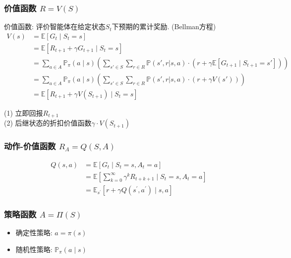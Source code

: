 \documentclass{article}
\begin{document}
        \subsubsection{价值函数 $R = V(S)$}
            价值函数: 评价智能体在给定状态$S_t$下预期的累计奖励. (Bellman方程)
            \begin{align*}
                V(s) 
                &= \mathbb{E} \left[G_t \mid S_t=s\right] \tag{定义}\\
                &= \mathbb{E} \left[R_{t+1} + \gamma G_{t+1} \mid S_t=s\right] \tag{代换}\\
                &= \sum_{a \in A} \mathbb{P}_\pi(a \mid s) \left( \sum_{s' \in S} \sum_{r \in R} \mathbb{P}(s', r | s, a)\cdot \left(r + \gamma \mathbb{E} \left[G_{t+1} \mid S_{t+1} = s'\right]\right) \right) \tag{期望公式}\\
                &= \sum_{a \in A} \mathbb{P}_\pi(a \mid s) \left( \sum_{s' \in S} \sum_{r \in R} \mathbb{P}(s', r | s, a)\cdot \left(r + \gamma V(s') \right) \right) \tag{代换}\\
                &= \mathbb{E} \left[R_{t+1} + \gamma V(S_{t+1}) \mid S_t=s\right]
            \end{align*}

            (1) 立即回报$R_{t+1}$\\
        	(2) 后继状态的折扣价值函数$\gamma \cdot V(S_{t+1})$
        
        \subsubsection{动作-价值函数 $R_A = Q(S,A)$}
            \begin{align*}
                Q(s,a) 
                &= \mathbb{E}\left[G_t \mid S_t=s, A_t = a\right]\\
                &= \mathbb{E}\left[\sum_{k=0}^\infty \gamma^k R_{t+k+1} \mid S_t = s, A_t = a\right]\\
                &= \mathbb{E}_{s^{\prime}}\left[r+\gamma Q\left(s^{\prime}, a^{\prime}\right) \mid s, a\right]
            \end{align*}
            
        \subsubsection{策略函数 $A = \Pi(S)$}
            \begin{itemize}
                \item 确定性策略: $a = \pi(s)$
                \item 随机性策略: $\mathbb{P}_\pi(a \mid s)$
            \end{itemize}
            
\end{document}
